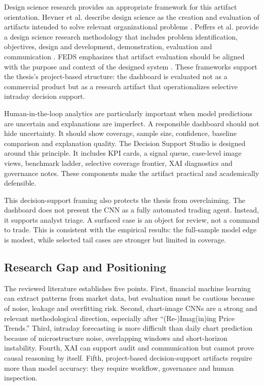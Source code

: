 Design science research provides an appropriate framework for this artifact orientation. Hevner et al. describe design science as the creation and evaluation of artifacts intended to solve relevant organizational problems \cite{hevner_dsr}. Peffers et al. provide a design science research methodology that includes problem identification, objectives, design and development, demonstration, evaluation and communication \cite{peffers_dsrm}. FEDS emphasizes that artifact evaluation should be aligned with the purpose and context of the designed system \cite{venable_feds}. These frameworks support the thesis's project-based structure: the dashboard is evaluated not as a commercial product but as a research artifact that operationalizes selective intraday decision support.

Human-in-the-loop analytics are particularly important when model predictions are uncertain and explanations are imperfect. A responsible dashboard should not hide uncertainty. It should show coverage, sample size, confidence, baseline comparison and explanation quality. The Decision Support Studio is designed around this principle. It includes KPI cards, a signal queue, case-level image views, benchmark ladder, selective coverage frontier, XAI diagnostics and governance notes. These components make the artifact practical and academically defensible.

This decision-support framing also protects the thesis from overclaiming. The dashboard does not present the CNN as a fully automated trading agent. Instead, it supports analyst triage. A surfaced case is an object for review, not a command to trade. This is consistent with the empirical results: the full-sample model edge is modest, while selected tail cases are stronger but limited in coverage.

\subsection{Research Gap and Positioning}
\label{subsec:research_gap}

The reviewed literature establishes five points. First, financial machine learning can extract patterns from market data, but evaluation must be cautious because of noise, leakage and overfitting risk. Second, chart-image CNNs are a strong and relevant methodological direction, especially after ``(Re-)Imag(in)ing Price Trends.'' Third, intraday forecasting is more difficult than daily chart prediction because of microstructure noise, overlapping windows and short-horizon instability. Fourth, XAI can support audit and communication but cannot prove causal reasoning by itself. Fifth, project-based decision-support artifacts require more than model accuracy: they require workflow, governance and human inspection.

